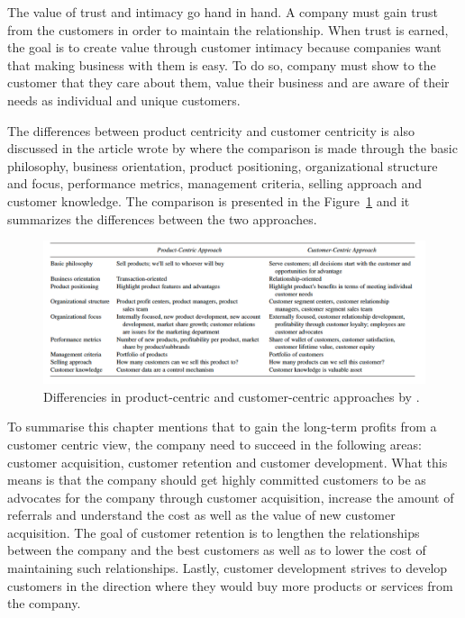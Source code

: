 The value of trust and intimacy go hand in hand. A company must gain trust from the customers in order to maintain the relationship. When trust is earned, the goal is to create value through customer intimacy because companies want that making business with them is easy. To do so, company must show to the customer that they care about them, value their business and are aware of their needs as individual and unique customers. \parencite{Parniangtong:2017}

The differences between product centricity and customer centricity is also discussed in the article wrote by \textcite{PathToCustomerCentricity:2006} where the comparison is made through the basic philosophy, business orientation, product positioning, organizational structure and focus, performance metrics, management criteria, selling approach and customer knowledge. The comparison is presented in the Figure~\ref{fig:productvscustomer} and it summarizes the differences between the two approaches.

\begin{figure}[ht]
  \begin{center}
    \includegraphics[scale=2, width=\textwidth]{dippa/images/ProductVsCustomer.png}
    \caption{Differencies in product-centric and customer-centric approaches by \textcite{PathToCustomerCentricity:2006}.}
    \label{fig:productvscustomer}
  \end{center}
\end{figure}

To summarise this chapter \textcite{Fader:2012} mentions that to gain the long-term profits from a customer centric view, the company need to succeed in the following areas: customer acquisition, customer retention and customer development. What this means is that the company should get highly committed customers to be as advocates for the company through customer acquisition, increase the amount of referrals and understand the cost as well as the value of new customer acquisition. The goal of customer retention is to lengthen the relationships between the company and the best customers as well as to lower the cost of maintaining such relationships. Lastly, customer development strives to develop customers in the direction where they would buy more products or services from the company.

